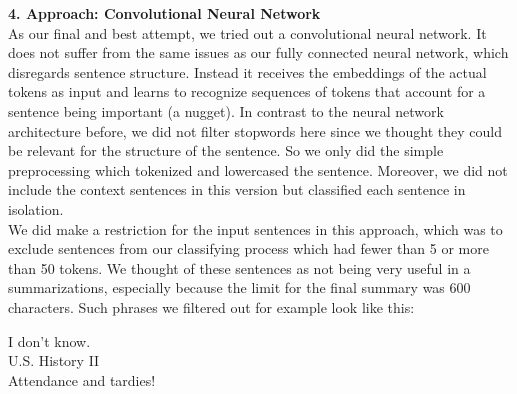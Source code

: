 \textbf{4. Approach: Convolutional Neural Network}\\
As our final and best attempt, we tried out a convolutional neural network.  It does not suffer from the same issues as our fully connected neural network, which disregards sentence structure. Instead it receives the embeddings of the actual tokens as input and learns to recognize sequences of tokens that account for a sentence being important (a nugget). In contrast to the neural network architecture before, we did not filter stopwords here since we thought they could be relevant for the structure of the sentence. So we only did the simple preprocessing which tokenized and lowercased the sentence. Moreover, we did not include the context sentences in this version but classified each sentence in isolation. \\
We did make a restriction for the input sentences in this approach, which was to exclude sentences from our classifying process which had fewer than 5 or more than 50 tokens. We thought of these sentences as not being very useful in a summarizations, especially because the limit for the final summary was 600 characters. Such phrases we filtered out for example look like this:
\begin{center}
I don't know.\\
U.S. History II\\
Attendance and tardies!
\end{center}



